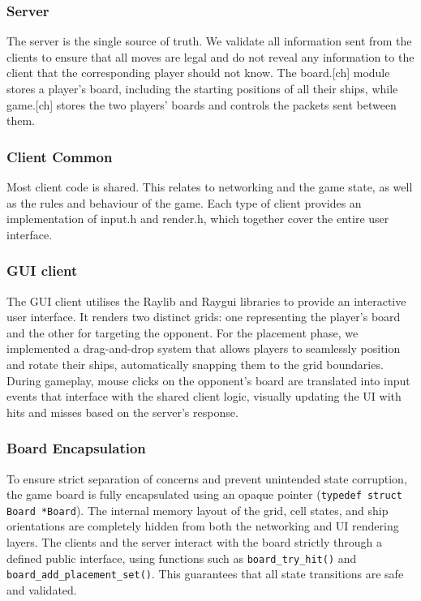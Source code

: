 \documentclass[11pt]{article}
\begin{document}
\subsubsection{Server}

The server is the single source of truth. We validate all information sent from the clients to ensure that all moves are legal and do not reveal any information to the client that the corresponding player should not know. The board.[ch] module stores a player's board, including the starting positions of all their ships, while game.[ch] stores the two players' boards and controls the packets sent between them.

\subsubsection{Client Common}

Most client code is shared. This relates to networking and the game state, as well as the rules and behaviour of the game. Each type of client provides an implementation of input.h and render.h, which together cover the entire user interface.

\subsubsection{GUI client}

The GUI client utilises the Raylib and Raygui libraries to provide an interactive user interface. It renders two distinct grids: one representing the player's board and the other for targeting the opponent. For the placement phase, we implemented a drag-and-drop system that allows players to seamlessly position and rotate their ships, automatically snapping them to the grid boundaries. During gameplay, mouse clicks on the opponent's board are translated into input events that interface with the shared client logic, visually updating the UI with hits and misses based on the server's response.

\subsubsection{Board Encapsulation}
To ensure strict separation of concerns and prevent unintended state corruption, the game board is fully encapsulated using an opaque pointer (\texttt{typedef struct Board *Board}). The internal memory layout of the grid, cell states, and ship orientations are completely hidden from both the networking and UI rendering layers. The clients and the server interact with the board strictly through a defined public interface, using functions such as \texttt{board\_try\_hit()} and \texttt{board\_add\_placement\_set()}. This guarantees that all state transitions are safe and validated.
\end{document}
